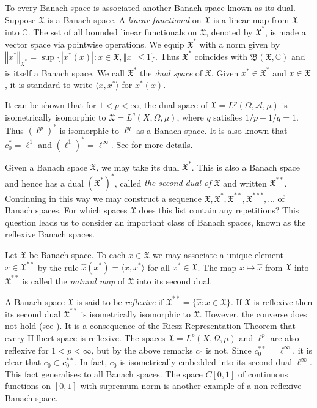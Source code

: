 \documentclass[mstat,12pt]{unswthesis}  %
\newcommand{\C}{\mathbb{C}}
\newcommand{\B}{\mathfrak{B}}
\newcommand{\X}{\mathfrak{X}}
\newcommand{\A}{\mathcal{A}}
\newcommand{\hatt}[1]{\widehat #1}
\def\ip<#1,#2>{\langle #1,#2 \rangle}
\def\lp{\ell^p}
\def\norm#1{\left \Vert #1 \right \Vert}
\numberwithin{equation}{section}
\begin{document}
To every Banach space is associated another Banach space known as its dual.
Suppose $\X$ is a Banach space. A {\em linear functional} on $\X$ is a linear
map from $\X$ into $\C$. The set of all bounded linear functionals on $\X$,
denoted
by $\X^*$, is made a vector space via pointwise operations. We equip $\X^*$ with
a norm given by $\norm{x^*}_{\X^*}=\sup\{|x^*(x)|:x\in\X,\norm{x}\leq 1\}$.
Thus $\X^*$ coincides with $\B(\X,\C)$ and is itself a Banach
space. We call $\X^*$ the {\em dual space} of $\X$. Given $x^*\in\X^*$ and
$x\in\X$, it is standard to write
$\ip<x,x^*>$ for $x^*(x)$.

It can be shown that for $1<p<\infty$, the dual space of $\X=L^p(\Omega,\A,\mu)$
is isometrically isomorphic to $\X=L^q(X,\Omega,\mu)$, where $q$ satisfies
$1/p+1/q=1$. Thus $(\lp)^*$ is isomorphic to $\ell^q$ as a Banach space. It is
also known that $c_0^*=\ell^1$ and $(\ell^1)^*=\ell^{\infty}$. See
\cite[Chapter III, \S 5 and \S 11]{Con} for more details.

Given a Banach space $\X$, we may take its dual $\X^*$. This is also a Banach
space and hence has a dual $(\X^*)^*$, called {\em the second dual of $\X$}
and written $\X^{**}$. Continuing in this way we may construct a sequence
$\X,\X^*,\X^{**},\X^{***},\ldots$ of Banach spaces. For which
spaces $\X$ does this list contain any repetitions? This question leads us to
consider an important class of Banach spaces, known as the reflexive Banach
spaces.

Let $\X$ be Banach space. To each $x\in\X$ we may associate a unique element
$\hatt{x}\in\X^{**}$ by the rule $\hatt{x}(x^*)=\ip<x,x^*>$ for all $x^*\in\X$.
The map $x\mapsto\hatt{x}$ from $\X$ into $\X^{**}$ is called the {\em natural
map} of $\X$ into its second dual.

A Banach space $\X$ is said to be {\em reflexive} if
$\X^{**}=\{\hatt{x}:x\in\X\}$. If $\X$ is reflexive then its second dual
$\X^{**}$ is isometrically isomorphic to $\X$. However, the converse does not
hold (see \cite[III.11]{Con}). It is a consequence of the Riesz Representation
Theorem \cite[I.3.4]{Con} that every Hilbert space is reflexive.
The spaces $\X=L^p(X,\Omega,\mu)$ and
$\lp$ are also reflexive for $1<p<\infty$, but by the above remarks $c_0$ is 
not. Since
$c_0^{**}=\ell^{\infty}$, it is clear that $c_0\subset c_0^{**}$. In fact,
$c_0$ is isometrically embedded into its second dual $\ell^{\infty}$. This fact
generalises to
all Banach spaces. The space $C[0,1]$ of continuous functions on $[0,1]$ with
supremum norm is another example of a non-reflexive Banach space.
\end{document}
